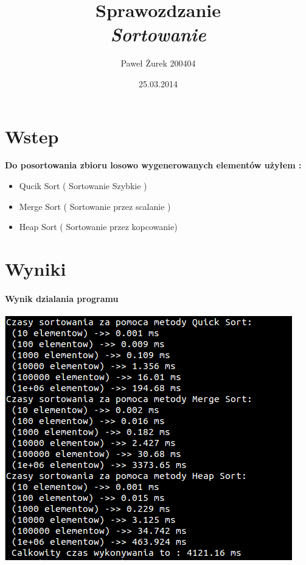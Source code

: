 \documentclass[10 pt]{article}
\title{Sprawozdzanie\\ \emph{Sortowanie}}
\author{Paweł Żurek 200404}
\date{25.03.2014}
\begin{document}
\tableofcontents
\maketitle
\section{Wstep}
\textbf{Do posortowania zbioru losowo wygenerowanych elementów użyłem : }
\begin{itemize}
\item Qucik Sort ( Sortowanie Szybkie )
\item Merge Sort ( Sortowanie przez scalanie )
\item Heap Sort ( Sortowanie przez kopcowanie)
\end{itemize}
\section{Wyniki}

\paragraph{Wynik dzialania programu\\}
\begin{center}
\includegraphics[scale=0.6]{WYKONANIE.png}
\end{center}
\end{document}
